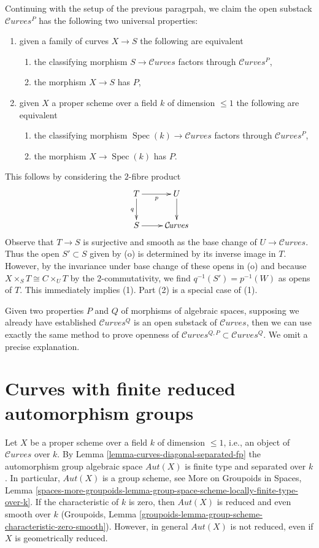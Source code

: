 \documentclass{stacks-project}
\theoremstyle{plain}
\theoremstyle{definition}
\theoremstyle{remark}
\numberwithin{equation}{subsection}
\def\Spec{\mathop{\mathrm{Spec}}}
\def\Curvesstack{\mathcal{C}\!\mathit{urves}}
\begin{document}
\medskip\noindent
Continuing with the setup of the previous paragrpah, we claim
the open substack $\Curvesstack^P$ has the following two universal properties:
\begin{enumerate}
\item given a family of curves $X \to S$ the following are equivalent
\begin{enumerate}
\item the classifying morphism $S \to \Curvesstack$ factors through
$\Curvesstack^P$,
\item the morphism $X \to S$ has $P$,
\end{enumerate}
\item given $X$ a proper scheme over a field $k$ of dimension $\leq 1$
the following are equivalent
\begin{enumerate}
\item the classifying morphism $\Spec(k) \to \Curvesstack$ factors
through $\Curvesstack^P$,
\item the morphism $X \to \Spec(k)$ has $P$.
\end{enumerate}
\end{enumerate}
This follows by considering the $2$-fibre product
$$
\xymatrix{
T \ar[r]_p \ar[d]_q & U \ar[d] \\
S \ar[r] & \Curvesstack
}
$$
Observe that $T \to S$ is surjective and smooth as the base
change of $U \to \Curvesstack$. Thus the open $S' \subset S$
given by (o) is determined by its inverse image in $T$.
However, by the invariance under base change of these opens in (o) 
and because $X \times_S T \cong C \times_U T$ by the $2$-commutativity,
we find $q^{-1}(S') = p^{-1}(W)$ as opens of $T$.
This immediately implies (1). Part (2) is a special case of (1).

\medskip\noindent
Given two properties $P$ and $Q$ of morphisms of algebraic spaces,
supposing we already have established $\Curvesstack^Q$ is
an open substack of $\Curvesstack$, then we can use exactly
the same method to prove openness of
$\Curvesstack^{Q, P} \subset \Curvesstack^Q$.
We omit a precise explanation.



\section{Curves with finite reduced automorphism groups}
\label{section-finite-aut}

\noindent
Let $X$ be a proper scheme over a field $k$ of dimension $\leq 1$, i.e.,
an object of $\Curvesstack$ over $k$.
By Lemma \ref{lemma-curves-diagonal-separated-fp}
the automorphism group algebraic space $\mathit{Aut}(X)$
is finite type and separated over $k$.
In particular, $\mathit{Aut}(X)$ is a group scheme, see
More on Groupoids in Spaces, Lemma
\ref{spaces-more-groupoids-lemma-group-space-scheme-locally-finite-type-over-k}.
If the characteristic of $k$ is zero, then $\mathit{Aut}(X)$
is reduced and even smooth over $k$ (Groupoids, Lemma
\ref{groupoids-lemma-group-scheme-characteristic-zero-smooth}).
However, in general $\mathit{Aut}(X)$ is not reduced, even
if $X$ is geometrically reduced.
\end{document}
